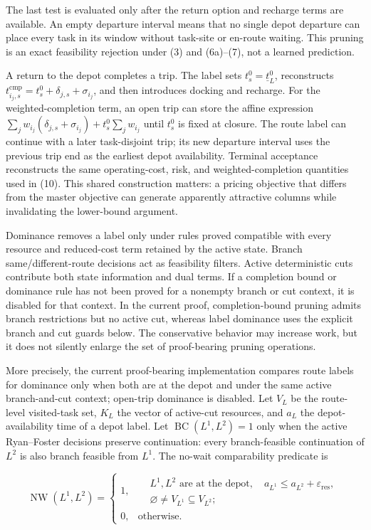 \documentclass[
  11pt,
]{article}
\begin{document}
The last test is evaluated only after the return option and recharge
terms are available. An empty departure interval means that no single
depot departure can place every task in its window without task-site or
en-route waiting. This pruning is an exact feasibility rejection under
(3) and (6a)--(7), not a learned prediction.

A return to the depot completes a trip. The label sets
\(t_s^0=\underline t_L^0\), reconstructs
\(t_{i_j,s}^{\mathrm{cmp}}=t_s^0+\delta_{j,s}+\sigma_{i_j}\), and then
introduces docking and recharge. For the weighted-completion term, an
open trip can store the affine expression
\(\sum_j w_{i_j}(\delta_{j,s}+\sigma_{i_j}) +t_s^0\sum_j w_{i_j}\) until
\(t_s^0\) is fixed at closure. The route label can continue with a later
task-disjoint trip; its new departure interval uses the previous trip
end as the earliest depot availability. Terminal acceptance reconstructs
the same operating-cost, risk, and weighted-completion quantities used
in (10). This shared construction matters: a pricing objective that
differs from the master objective can generate apparently attractive
columns while invalidating the lower-bound argument.

Dominance removes a label only under rules proved compatible with every
resource and reduced-cost term retained by the active state. Branch
same/different-route decisions act as feasibility filters. Active
deterministic cuts contribute both state information and dual terms. If
a completion bound or dominance rule has not been proved for a nonempty
branch or cut context, it is disabled for that context. In the current
proof, completion-bound pruning admits branch restrictions but no active
cut, whereas label dominance uses the explicit branch and cut guards
below. The conservative behavior may increase work, but it does not
silently enlarge the set of proof-bearing pruning operations.

More precisely, the current proof-bearing implementation compares route
labels for dominance only when both are at the depot and under the same
active branch-and-cut context; open-trip dominance is disabled. Let
\(V_L\) be the route-level visited-task set, \(K_L\) the vector of
active-cut resources, and \(a_L\) the depot-availability time of a depot
label. Let \(\operatorname{BC}(L^1,L^2)=1\) only when the active
Ryan--Foster decisions preserve continuation: every branch-feasible
continuation of \(L^2\) is also branch feasible from \(L^1\). The
no-wait comparability predicate is

\[
\operatorname{NW}(L^1,L^2)=
\begin{cases}
1, &
\begin{aligned}
&L^1,L^2\text{ are at the depot},\quad
a_{L^1}\le a_{L^2}+\varepsilon_{\mathrm{res}},\\
&\varnothing\ne V_{L^1}\subseteq V_{L^2};
\end{aligned}\\[2mm]
0, & \text{otherwise}.
\end{cases}
\]
\end{document}
